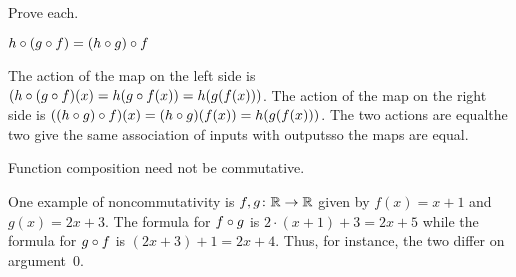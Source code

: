 \documentclass{test}  %
\begin{document}
\begin{problem} Prove each.
\begin{exes}
\begin{exercise}
  $h\mathbin{\circ} (g\mathbin{\circ} f)=(h\mathbin{\circ} g)\mathbin{\circ} f$    
\end{exercise}
\begin{answer}
  The action of the map on the left side
  is $(h\mathbin{\circ} (g\mathbin{\circ} f)(x)=h(g\mathbin{\circ} f(x))
       =h(g(f(x)))$.
  The action of the map on the right side  
  is $((h\mathbin{\circ} g)\mathbin{\circ} f)(x)=(h\mathbin{\circ} g)(f(x))
      =h(g(f(x)))$.
  The two actions are equal\Dash the two give the same association of inputs
  with outputs\Dash so the maps are equal.  
\end{answer}
\begin{exercise} 
  Function composition need not be commutative.
\end{exercise}
\begin{answer}
  One example of noncommutativity is $\mbox{$f,g\colon \mathbb{R}\to \mathbb{R}$}$ given by 
  $f(x)=x+1$ and $g(x)=2x+3$.
  The formula for $f\mathbin{\circ} g$ is $2\cdot(x+1)+3=2x+5$ while
  the formula for $g\mathbin{\circ} f$ is $(2x+3)+1=2x+4$.
  Thus, for instance, the two differ on argument~$0$.  
\end{answer}
\end{exes}
\end{problem}
\end{document}

